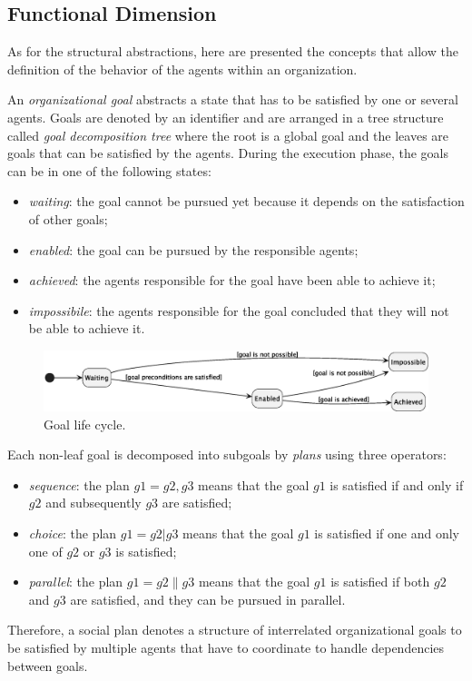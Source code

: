 \subsection{Functional Dimension}
As for the structural abstractions, here are presented the concepts that allow the definition of the behavior of the agents within an organization.

An \textit{organizational goal} abstracts a state that has to be satisfied by one or several agents.
Goals are denoted by an identifier and are arranged in a tree structure called \textit{goal decomposition tree} where the root is a global goal and the leaves are goals that can be satisfied by the agents.
During the execution phase, the goals can be in one of the following states:
\begin{itemize}
    \item \textit{waiting}: the goal cannot be pursued yet because it depends on the satisfaction of other goals;
    \item \textit{enabled}: the goal can be pursued by the responsible agents;
    \item \textit{achieved}: the agents responsible for the goal have been able to achieve it;
    \item \textit{impossibile}: the agents responsible for the goal concluded that they will not be able to achieve it.
\end{itemize}

\begin{figure}
    \centering
    \includegraphics[width=\textwidth]{images/goal-life-cycle.eps}
    \caption{Goal life cycle.}
    \label{fig:goal-life-cycle}
\end{figure}

Each non-leaf goal is decomposed into subgoals by \textit{plans} using three operators:
\begin{itemize}
    \item \textit{sequence}: the plan $g1 = g2, g3$ means that the goal $g1$ is satisfied if and only if $g2$ and subsequently $g3$ are satisfied;
    \item \textit{choice}: the plan $g1 = g2 | g3$ means that the goal $g1$ is satisfied if one and only one of $g2$ or $g3$ is satisfied;
    \item \textit{parallel}: the plan $g1 = g2 \parallel g3$ means that the goal $g1$ is satisfied if both $g2$ and $g3$ are satisfied, and they can be pursued in parallel.
\end{itemize}
Therefore, a social plan denotes a structure of interrelated organizational goals to be satisfied by multiple agents that have to coordinate to handle dependencies between goals.


